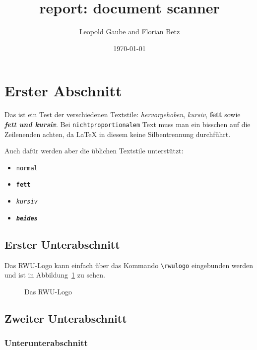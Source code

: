 \documentclass{scrartcl}
\title{report: document scanner}
\author{Leopold Gaube and Florian Betz}
\date{\today}
\begin{document}
	\maketitle
	\tableofcontents

	\clearpage

	\section{Erster Abschnitt}

		Das ist ein Test der verschiedenen Textstile:
		\emph{hervorgehoben}, \textit{kursiv}, \textbf{fett} sowie
		\textit{\textbf{fett und kursiv}}.
		Bei \texttt{nichtproportionalem} Text muss man ein bisschen
		auf die Zeilenenden achten, da \LaTeX{} in diesem keine
		Silbentrennung durchführt.

		Auch dafür werden aber die üblichen Textstile unterstützt:
		\begin{itemize}
			\item \texttt{normal}
			\item \texttt{\textbf{fett}}
			\item \texttt{\textit{kursiv}}
			\item \texttt{\textbf{\textit{beides}}}
		\end{itemize}

		\subsection{Erster Unterabschnitt}

			Das RWU-Logo kann einfach über das Kommando
			\verb?\rwulogo? eingebunden werden und ist in
			Abbildung~\ref{fig:logo} zu sehen.

			\begin{figure}[hb]
				\centering
				\rwulogo[width=0.5\columnwidth]
				\caption{Das RWU-Logo}
				\label{fig:logo}
			\end{figure}

		\subsection{Zweiter Unterabschnitt}

			\lipsum[1]

			\subsubsection{Unterunterabschnitt}

			\lipsum[2-5]
\end{document}
